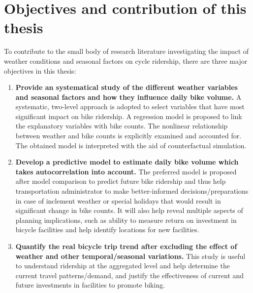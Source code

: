 \documentclass [11pt, proquest] {uwthesis}[2015/03/03]
\begin{document}
\section{Objectives and contribution of this thesis}
To contribute to the small body of research literature investigating the impact of weather conditions and seasonal factors on cycle ridership, there are three major objectives in this thesis:
\begin{enumerate}
\item \textbf{Provide an systematical study of the different weather variables and seasonal factors and how they influence daily bike volume.} A systematic, two-level approach is adopted to select variables that have most significant impact on bike ridership. A regression model is proposed to link the explanatory variables with bike counts. The nonlinear relationship between weather and bike counts is explicitly examined and accounted for. The obtained model is interpreted with the aid of counterfactual simulation. 
\item \textbf{Develop a predictive model to estimate daily bike volume which takes autocorrelation into account.} The preferred model is proposed after model comparison to predict future bike ridership and thus help transportation administrator to make better-informed decisions/preparations in case of inclement weather or special holidays that would result in significant change in bike counts. It will also help reveal multiple aspects of planning implications, such as ability to measure return on investment in bicycle facilities and help identify locations for new facilities. 
\item \textbf{Quantify the real bicycle trip trend after excluding the effect of weather and other temporal/seasonal variations.} This study is useful to understand ridership at the aggregated level and help determine the current travel patterns/demand, and justify the effectiveness of current and future investments in facilities to promote biking.
\end{enumerate}
\end{document}
